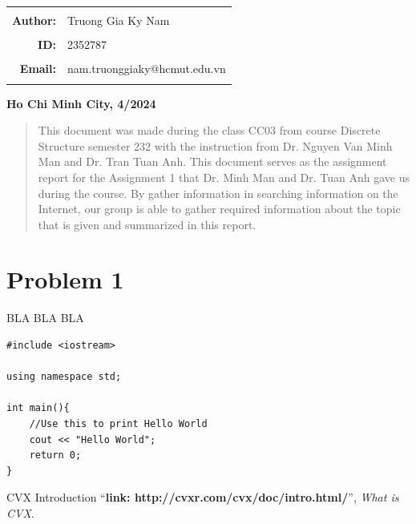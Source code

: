 \documentclass[a4paper]{article}
\begin{document}
\begin{titlepage}
\begin{center}
\begin{tabular}{ccc}
    \\ \\

    \multicolumn{1}{r}{\Large \textbf{Author:}} & \multicolumn{2}{l}{\Large Truong Gia Ky Nam} \\ \\

    \multicolumn{1}{r}{\Large \textbf{ID:}} & \multicolumn{2}{l}{\Large 2352787} \\ \\

    \multicolumn{1}{r}{\Large \textbf{Email:}} & \multicolumn{2}{l}{\Large nam.truonggiaky@hcmut.edu.vn} \\ \\
\end{tabular}
\end{center}

\vspace{4cm}

\begin{center}
{\textbf{\Large Ho Chi Minh City, 4/2024}}
\end{center}
\end{titlepage}

\thispagestyle{empty}
\setcounter{page}{-1}
\newpage
\tableofcontents
\newpage

\thispagestyle{empty}
\newpage
\begin{abstract}
\noindent This document was made during the class CC03 from course Discrete Structure semester 232 with the instruction from Dr. Nguyen Van Minh Man and Dr. Tran Tuan Anh. This document serves as the assignment report for the Assignment 1 that Dr. Minh Man and Dr. Tuan Anh gave us during the course. By gather information in searching information on the Internet, our group is able to gather required information about the topic that is given and summarized in this report.
\end{abstract}
\newpage

\section{Problem 1}
BLA BLA BLA

\pagebreak

\begin{verbatim}
#include <iostream>

using namespace std;

int main(){
    //Use this to print Hello World
    cout << "Hello World";
    return 0;
}
\end{verbatim}
\begin{thebibliography}{80}

CVX Introduction
``\textbf{link: http://cvxr.com/cvx/doc/intro.html/}'',
\textit{What is CVX}.

\end{thebibliography}
\end{document}
